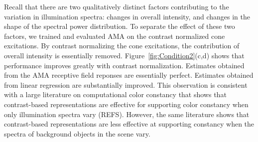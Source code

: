 \documentclass{jov}
\begin{document}
Recall that there are two qualitatively distinct factors contributing to the variation in illumination spectra: changes in overall intensity, and changes in the shape of the spectral power distribution. 
To separate the effect of these two factors, we trained and evaluated AMA on the contrast normalized cone excitations. 
By contrast normalizing the cone excitations, the contribution of overall intensity is essentially removed.
Figure~\ref{fig:Condition2}(c,d) shows that performance improves greatly with contrast normalization. 
Estimates obtained from the AMA receptive field reponses are essentially perfect. 
Estimates obtained from linear regression are substantially improved.
This observation is consistent with a large literature on computational color constancy that shows that 
contrast-based representations are effective for supporting color constancy when only illumination spectra vary (REFS).
However, the same literature shows that contrast-based representations are less effective at supporting constancy when the spectra of background objects in the scene vary.
\end{document}
